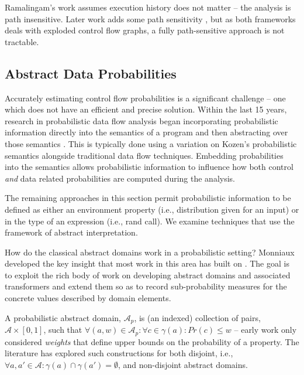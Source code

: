 Ramalingam's work assumes execution history does not matter --  
the analysis is path insensitive.
Later work adds some path sensitivity \cite{mehofer2001novel}, 
but as both frameworks deals with exploded control flow graphs, a fully 
path-sensitive approach is not tractable.

\subsection{Abstract Data Probabilities}
Accurately estimating control flow probabilities is a significant
challenge -- one which does not have an efficient and precise solution.
Within the last 15 years, research in probabilistic data flow analysis
began incorporating probabilistic information directly into
the semantics of a program and then abstracting over 
those semantics \cite{monniaux2000abstract,others}.
This is typically done using a variation on Kozen's 
probabilistic semantics \cite{kozen1981semantics} 
alongside traditional data flow techniques.
Embedding probabilities into the semantics allows probabilistic
information to influence how both control {\sl and} data related
probabilities are computed during the analysis.

The remaining approaches in this section permit probabilistic
information to be defined as either an environment property
(i.e., distribution given for an input) or in the type of
an expression (i.e., rand call).
We examine techniques that use the framework of abstract
interpretation.

How do the classical abstract domains work in a
probabilistic setting?
Monniaux \cite{monniaux2000abstract} developed the key 
insight that most work in this area has built on 
\cite{monniaux2001backwards,wachterVMCAI10,esparzaSAS11}.
The goal is to exploit the rich body of work on developing
abstract domains and associated transformers and extend them
so as to record sub-probability measures for the concrete values
described by domain elements.

A probabilistic abstract domain, $\mathcal{A}_p$, 
is (an indexed) collection of pairs, 
$\mathcal{A} \times [0,1]$,
such that $\forall (a,w) \in \mathcal{A}_p : 
\forall c \in \gamma(a) : Pr(c) \le w$ -- early work only
considered \textit{weights} that define upper bounds on the 
probability of a property. 
The literature has explored such constructions for both
disjoint, i.e., $\forall a,a' \in \mathcal{A} : 
\gamma(a) \cap \gamma(a') = \emptyset$, and non-disjoint abstract domains.

